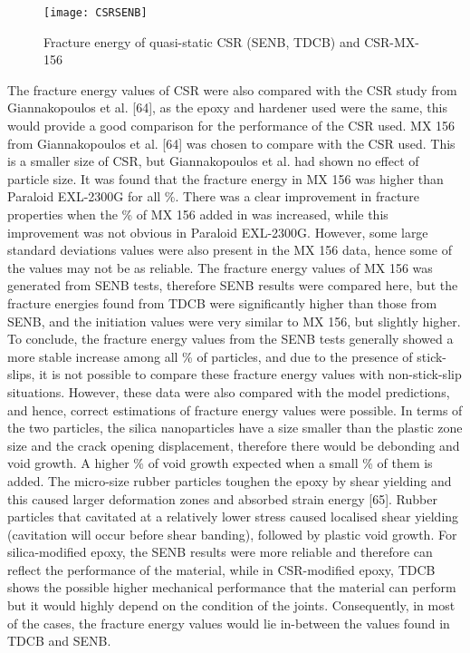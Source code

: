 \documentclass[numbers=noendperiod,chapterprefix=on]{icldt} %
\begin{document}
\begin{figure}[!htpb]
\centering
\texttt{[image: CSRSENB]}
\caption{Fracture energy of quasi-static CSR (SENB, TDCB) and CSR-MX-156} %
\end{figure}

The fracture energy values of CSR were also compared with the CSR study from Giannakopoulos et al. [64], as the epoxy and hardener used were the same, this would provide a good comparison for the performance of the CSR used. 
MX 156 from Giannakopoulos et al. [64] was chosen to compare with the CSR used. This is a smaller size of CSR, but Giannakopoulos et al. had shown no effect of particle size. It was found that the fracture energy in MX 156 was higher than Paraloid EXL-2300G for all \%. There was a clear improvement in fracture properties when the \% of MX 156 added in was increased, while this improvement was not obvious in Paraloid EXL-2300G. However, some large standard deviations values were also present in the MX 156 data, hence some of the values may not be as reliable. The fracture energy values of MX 156 was generated from SENB tests, therefore SENB results were compared here, but the fracture energies found from TDCB were significantly higher than those from SENB, and the initiation values were very similar to MX 156, but slightly higher. 
To conclude, the fracture energy values from the SENB tests generally showed a more stable increase among all \% of particles, and due to the presence of stick-slips, it is not possible to compare these fracture energy values with non-stick-slip situations. However, these data were also compared with the model predictions, and hence, correct estimations of fracture energy values were possible. 
In terms of the two particles, the silica nanoparticles have a size smaller than the plastic zone size and the crack opening displacement, therefore there would be debonding and void growth. A higher \% of void growth expected when a small \% of them is added. 
The micro-size rubber particles toughen the epoxy by shear yielding and this caused larger deformation zones and absorbed strain energy [65]. Rubber particles that cavitated at a relatively lower stress caused localised shear yielding (cavitation will occur before shear banding), followed by plastic void growth. 
For silica-modified epoxy, the SENB results were more reliable and therefore can reflect the performance of the material, while in CSR-modified epoxy, TDCB shows the possible higher mechanical performance that the material can perform but it would highly depend on the condition of the joints. Consequently, in most of the cases, the fracture energy values would lie in-between the values found in TDCB and SENB.
\end{document}
